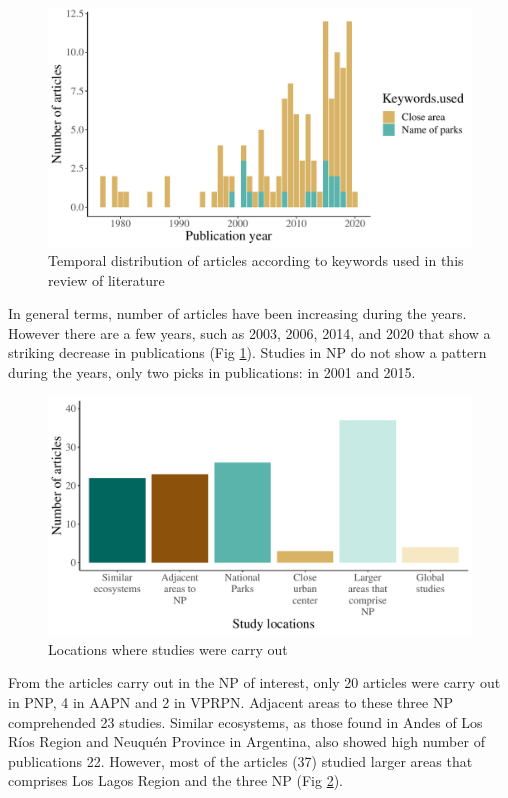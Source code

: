 \documentclass[]{article}
\begin{document}
\begin{figure}
\centering
\includegraphics{Review_and_climate_files/figure-latex/Years-1.pdf}
\caption{\label{fig:Years}Temporal distribution of articles according to keywords used in this review of literature}
\end{figure}

In general terms, number of articles have been increasing during the years. However there are a few years, such as 2003, 2006, 2014, and 2020 that show a striking decrease in publications (Fig \ref{fig:Years}). Studies in NP do not show a pattern during the years, only two picks in publications: in 2001 and 2015.

\begin{figure}
\centering
\includegraphics{Review_and_climate_files/figure-latex/Locations-1.pdf}
\caption{\label{fig:Locations}Locations where studies were carry out}
\end{figure}

From the articles carry out in the NP of interest, only 20 articles were carry out in PNP, 4 in AAPN and 2 in VPRPN.
Adjacent areas to these three NP comprehended 23 studies. Similar ecosystems, as those found in Andes of Los Ríos Region and Neuquén Province in Argentina, also showed high number of publications 22. However, most of the articles (37) studied larger areas that comprises Los Lagos Region and the three NP (Fig \ref{fig:Locations}).
\end{document}
